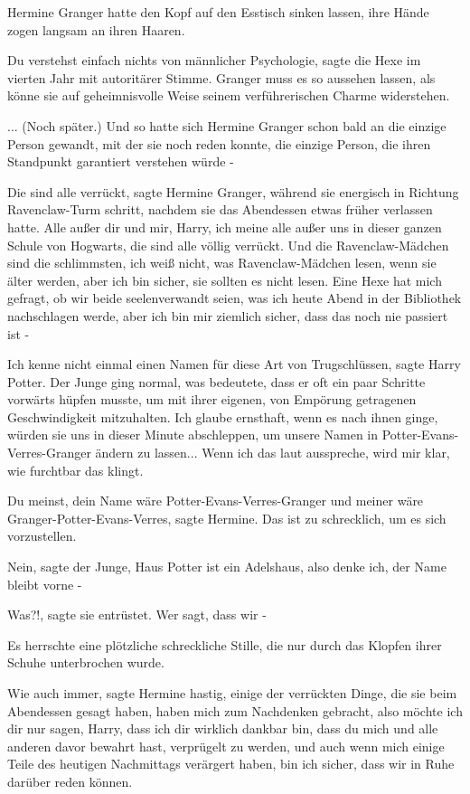 Hermine Granger hatte den Kopf auf den Esstisch sinken lassen, ihre Hände zogen
langsam an ihren Haaren.

\glqq Du verstehst einfach nichts von männlicher Psychologie\grqq{}, sagte die
Hexe im vierten Jahr mit autoritärer Stimme. \glqq Granger muss es so aussehen
lassen, als könne sie auf geheimnisvolle Weise seinem verführerischen Charme
widerstehen.\grqq{}


... (Noch später.) Und so hatte sich Hermine Granger schon bald an die einzige
Person gewandt, mit der sie noch reden konnte, die einzige Person, die ihren
Standpunkt garantiert verstehen würde -

\glqq Die sind alle verrückt\grqq{}, sagte Hermine Granger, während sie
energisch in Richtung Ravenclaw-Turm schritt, nachdem sie das Abendessen etwas
früher verlassen hatte. \glqq Alle außer dir und mir, Harry, ich meine alle
außer uns in dieser ganzen Schule von Hogwarts, die sind alle völlig verrückt.
Und die Ravenclaw-Mädchen sind die schlimmsten, ich weiß nicht, was
Ravenclaw-Mädchen lesen, wenn sie älter werden, aber ich bin sicher, sie sollten
es nicht lesen. Eine Hexe hat mich gefragt, ob wir beide seelenverwandt seien,
was ich heute Abend in der Bibliothek nachschlagen werde, aber ich bin mir
ziemlich sicher, dass das noch nie passiert ist -\grqq{}

\glqq Ich kenne nicht einmal einen Namen für diese Art von Trugschlüssen\grqq{},
sagte Harry Potter. Der Junge ging normal, was bedeutete, dass er oft ein paar
Schritte vorwärts hüpfen musste, um mit ihrer eigenen, von Empörung getragenen
Geschwindigkeit mitzuhalten. \glqq Ich glaube ernsthaft, wenn es nach ihnen
ginge, würden sie uns in dieser Minute abschleppen, um unsere Namen in
Potter-Evans-Verres-Granger ändern zu lassen... Wenn ich das laut ausspreche,
wird mir klar, wie furchtbar das klingt.\grqq{}

\glqq Du meinst, dein Name wäre Potter-Evans-Verres-Granger und meiner wäre
Granger-Potter-Evans-Verres\grqq{}, sagte Hermine. \glqq Das ist zu schrecklich,
um es sich vorzustellen.\grqq{}

\glqq Nein\grqq{}, sagte der Junge, \glqq Haus Potter ist ein Adelshaus, also
denke ich, der Name bleibt vorne -\grqq{}

\glqq Was?!\grqq{}, sagte sie entrüstet. \glqq Wer sagt, dass wir -\grqq{}

Es herrschte eine plötzliche schreckliche Stille, die nur durch das Klopfen
ihrer Schuhe unterbrochen wurde.

\glqq Wie auch immer\grqq{}, sagte Hermine hastig, \glqq einige der verrückten
Dinge, die sie beim Abendessen gesagt haben, haben mich zum Nachdenken gebracht,
also möchte ich dir nur sagen, Harry, dass ich dir wirklich dankbar bin, dass du
mich und alle anderen davor bewahrt hast, verprügelt zu werden, und auch wenn
mich einige Teile des heutigen Nachmittags verärgert haben, bin ich sicher, dass
wir in Ruhe darüber reden können.\grqq{}


